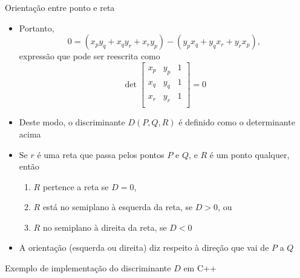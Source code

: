 \begin{frame}[fragile]{Orientação entre ponto e reta}
    \begin{itemize}
        \item Portanto,
        \[
            0 = (x_py_q + x_qy_r + x_ry_p) - (y_px_q + y_qx_r + y_rx_p),
        \]
        expressão que pode ser reescrita como
        \[
                \det \begin{bmatrix}
                x_p & y_p  & 1 \\
                x_q & y_q  & 1 \\
                x_r & y_r  & 1 \\
            \end{bmatrix} = 0
        \]
        \pause

        \item Deste modo, o discriminante $D(P, Q, R)$ é definido como o determinante acima
        \pause

        \item Se $r$ é uma reta que passa pelos pontos $P$ e $Q$, e $R$ é um ponto qualquer, então
        \pause

        \begin{enumerate}
            \item $R$ pertence a reta se $D = 0$,
            \pause

            \item $R$ está no semiplano à esquerda da reta, se $D > 0$, ou
            \pause

            \item $R$ no semiplano à direita da reta, se $D < 0$
        \end{enumerate}
        \pause

        \item A orientação (esquerda ou direita) diz respeito à direção que vai de $P$ a $Q$
    \end{itemize}

\end{frame}

\begin{frame}[fragile]{Exemplo de implementação do discriminante $D$ em C++}
\end{frame}

